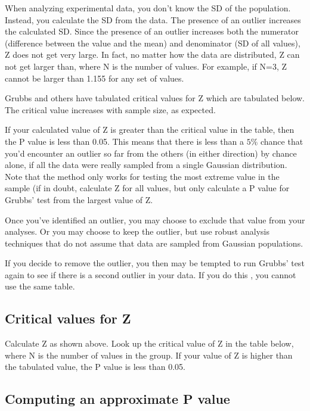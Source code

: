 \documentclass[12pt, a4paper]{report}
\theoremstyle{plain}
\theoremstyle{definition}
\theoremstyle{remark}
\begin{document}
When analyzing experimental data, you don't know the SD of the population. Instead, you calculate the SD from the data. The presence of an outlier increases the calculated SD. Since the presence of an outlier increases both the numerator (difference between the value and the mean) and denominator (SD of all values), Z does not get very large. In fact, no matter how the data are distributed, Z can not get larger than, where N is the number of values. For example, if N=3, Z cannot be larger than 1.155 for any set of values.

Grubbs and others have tabulated critical values for Z which are tabulated below. The critical value increases with sample size, as expected.

If your calculated value of Z is greater than the critical value in the table, then the P value is less than 0.05. This means that there is less than a $5\%$ chance that you'd encounter an outlier so far from the others (in either direction) by chance alone, if all the data were really sampled from a single Gaussian distribution. Note that the method only works for testing the most extreme value in the sample (if in doubt, calculate Z for all values, but only calculate a P value for Grubbs' test from the largest value of Z.

Once you've identified an outlier, you may choose to exclude that value from your analyses. Or you may choose to keep the outlier, but use robust analysis techniques that do not assume that data are sampled from Gaussian populations.

If you decide to remove the outlier, you then may be tempted to run Grubbs' test again to see if there is a second outlier in your data. If you do this , you cannot use the same table.


\subsection{Critical values for Z}

Calculate Z as shown above. Look up the critical value of Z in the table below, where N is the number of values in the group. If your value of Z is higher than the tabulated value, the P value is less than 0.05.








\subsection{Computing an approximate P value}
\end{document}

